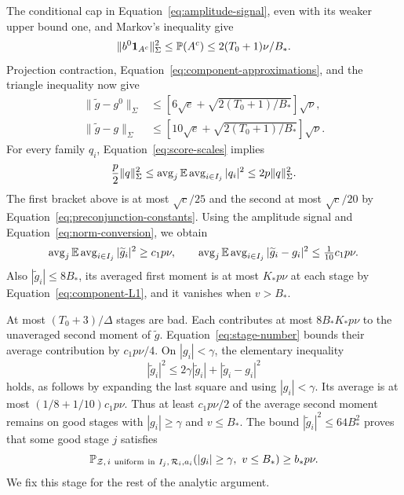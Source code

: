 The conditional cap in Equation~\ref{eq:amplitude-signal}, even with
its weaker upper bound one, and Markov's inequality give
\[
 \|b^0\mathbf 1_{A^c}\|_\Sigma^2
 \le\mathbb P(A^c)\le2(T_0+1)\nu/B_*.
\]
Projection contraction, Equation~\ref{eq:component-approximations},
and the triangle inequality now give
\begin{align}
 \|\widetilde g-g^0\|_\Sigma
 &\le[6\sqrt e+\sqrt{2(T_0+1)/B_*}]\sqrt\nu,
       \label{eq:clipped-signal-distance}\\
 \|\widetilde g-g\|_\Sigma
 &\le[10\sqrt e+\sqrt{2(T_0+1)/B_*}]\sqrt\nu.
       \label{eq:clipped-comparison-distance}
\end{align}
For every family $q_i$, Equation~\ref{eq:score-scales} implies
\begin{equation}\label{eq:norm-conversion}
 \frac p2\|q\|_\Sigma^2
 \le\operatorname{avg}_j\mathbb E\operatorname{avg}_{i\in I_j}|q_i|^2
 \le2p\|q\|_\Sigma^2.
\end{equation}
The first bracket above is at most $\sqrt c/25$ and the second at
most $\sqrt c/20$ by Equation~\ref{eq:preconjunction-constants}.
Using the amplitude signal and Equation~\ref{eq:norm-conversion},
we obtain
\begin{equation}\label{eq:clipped-signal}
 \operatorname{avg}_j\mathbb E\operatorname{avg}_{i\in I_j}
       |\widetilde g_i|^2\ge c_1p\nu,\qquad
 \operatorname{avg}_j\mathbb E\operatorname{avg}_{i\in I_j}
       |\widetilde g_i-g_i|^2\le\tfrac1{10}c_1p\nu.
\end{equation}
Also $|\widetilde g_i|\le8B_*$, its averaged first moment is at most
$K_*p\nu$ at each stage by Equation~\ref{eq:component-L1}, and it
vanishes when $v>B_*$.

At most $(T_0+3)/\Delta$ stages are bad. Each contributes at most
$8B_*K_*p\nu$ to the unaveraged second moment of $\widetilde g$.
Equation~\ref{eq:stage-number} bounds their average contribution by
$c_1p\nu/4$. On $|g_i|<\gamma$, the elementary inequality
\[
 |\widetilde g_i|^2\le2\gamma|\widetilde g_i|
                              +|\widetilde g_i-g_i|^2
\]
holds, as follows by expanding the last square and using
$|g_i|<\gamma$. Its average is at most
$(1/8+1/10)c_1p\nu$. Thus at least $c_1p\nu/2$ of the average
second moment remains on good stages with $|g_i|\ge\gamma$ and
$v\le B_*$. The bound $|\widetilde g_i|^2\le64B_*^2$ proves that
some good stage $j$ satisfies
\begin{equation}\label{eq:good-stage-signal}
 \mathbb P_{\mathcal Z,\,i\ {\rm uniform\ in}\ I_j,\,\mathcal R_i,a_i}
             (|g_i|\ge\gamma,\ v\le B_*)\ge b_*p\nu.
\end{equation}
We fix this stage for the rest of the analytic argument.
